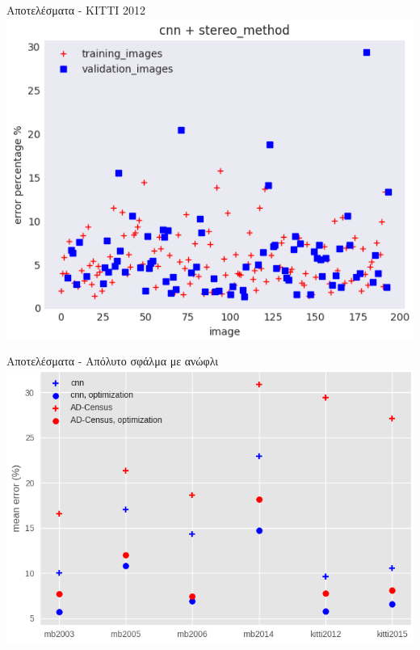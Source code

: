\documentclass[english,greek]{beamer}
\begin{document}
\begin{frame}{Αποτελέσματα - ΚΙΤΤΙ 2012}
\centering
\includegraphics[scale=0.45]{kitti2012_cnn_stereo_method_error_per_image.png}
\end{frame}


\begin{frame}{Αποτελέσματα - Απόλυτο σφάλμα με ανώφλι}
\centering
\includegraphics[scale=0.4]{absolute_error_thres.png}
\end{frame}
\end{document}
